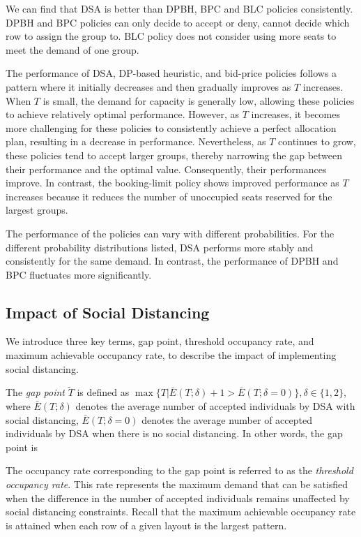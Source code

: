 We can find that DSA is better than DPBH, BPC and BLC policies consistently. DPBH and BPC policies can only decide to accept or deny, cannot decide which row to assign the group to. BLC policy does not consider using more seats to meet the demand of one group.

The performance of DSA, DP-based heuristic, and bid-price policies follows a pattern where it initially decreases and then gradually improves as $T$ increases. When $T$ is small, the demand for capacity is generally low, allowing these policies to achieve relatively optimal performance. However, as $T$ increases, it becomes more challenging for these policies to consistently achieve a perfect allocation plan, resulting in a decrease in performance. Nevertheless, as $T$ continues to grow, these policies tend to accept larger groups, thereby narrowing the gap between their performance and the optimal value. Consequently, their performances improve. In contrast, the booking-limit policy shows improved performance as $T$ increases because it reduces the number of unoccupied seats reserved for the largest groups. 

The performance of the policies can vary with different probabilities. For the different probability distributions listed, DSA performs more stably and consistently for the same demand. In contrast, the performance of DPBH and BPC fluctuates more significantly.


\subsection{Impact of Social Distancing}\label{impact_sd}
We introduce three key terms, gap point, threshold occupancy rate, and maximum achievable occupancy rate, to describe the impact of implementing social distancing.


The \textit{gap point} $\tilde{T}$ is defined as $\max\{T|\bar{E}(T; \delta)+1 > \bar{E}(T; \delta = 0)\}, \delta \in \{1,2\}$, where $\bar{E}(T; \delta)$ denotes the average number of accepted individuals by DSA with social distancing, $\bar{E}(T; \delta = 0)$ denotes the average number of accepted individuals by DSA when there is no social distancing. In other words, the gap point is 

The occupancy rate corresponding to the gap point is referred to as the \textit{threshold occupancy rate}. This rate represents the maximum demand that can be satisfied when the difference in the number of accepted individuals remains unaffected by social distancing constraints. Recall that the maximum achievable occupancy rate is attained when each row of a given layout is the largest pattern.

